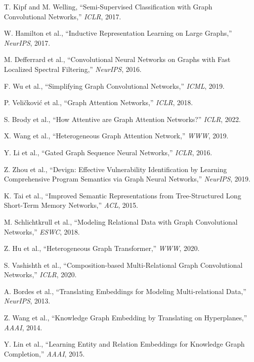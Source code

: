 \documentclass[12pt,a4paper]{article}
\begin{document}
\begin{enumerate}[leftmargin=1.5em, label={[\arabic*]}]
  \item T. Kipf and M. Welling, ``Semi-Supervised Classification with Graph
        Convolutional Networks,'' \textit{ICLR}, 2017.
  \item W. Hamilton et al., ``Inductive Representation Learning on Large
        Graphs,'' \textit{NeurIPS}, 2017.
  \item M. Defferrard et al., ``Convolutional Neural Networks on Graphs with
        Fast Localized Spectral Filtering,'' \textit{NeurIPS}, 2016.
  \item F. Wu et al., ``Simplifying Graph Convolutional Networks,''
        \textit{ICML}, 2019.
  \item P. Veli\v{c}kovi\'{c} et al., ``Graph Attention Networks,''
        \textit{ICLR}, 2018.
  \item S. Brody et al., ``How Attentive are Graph Attention Networks?''
        \textit{ICLR}, 2022.
  \item X. Wang et al., ``Heterogeneous Graph Attention Network,''
        \textit{WWW}, 2019.
  \item Y. Li et al., ``Gated Graph Sequence Neural Networks,'' \textit{ICLR},
        2016.
  \item Z. Zhou et al., ``Devign: Effective Vulnerability Identification by
        Learning Comprehensive Program Semantics via Graph Neural Networks,''
        \textit{NeurIPS}, 2019.
  \item K. Tai et al., ``Improved Semantic Representations from Tree-Structured
        Long Short-Term Memory Networks,'' \textit{ACL}, 2015.
  \item M. Schlichtkrull et al., ``Modeling Relational Data with Graph
        Convolutional Networks,'' \textit{ESWC}, 2018.
  \item Z. Hu et al., ``Heterogeneous Graph Transformer,'' \textit{WWW}, 2020.
  \item S. Vashishth et al., ``Composition-based Multi-Relational Graph
        Convolutional Networks,'' \textit{ICLR}, 2020.
  \item A. Bordes et al., ``Translating Embeddings for Modeling Multi-relational
        Data,'' \textit{NeurIPS}, 2013.
  \item Z. Wang et al., ``Knowledge Graph Embedding by Translating on
        Hyperplanes,'' \textit{AAAI}, 2014.
  \item Y. Lin et al., ``Learning Entity and Relation Embeddings for Knowledge
        Graph Completion,'' \textit{AAAI}, 2015.

\end{enumerate}
\end{document}
